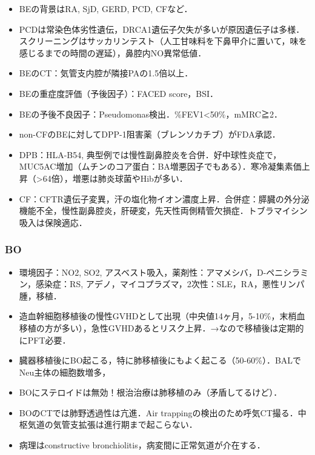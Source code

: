 \begin{itemize}
\item BEの背景はRA, SjD, GERD, PCD, CFなど．
\item PCDは常染色体劣性遺伝，DRCA1遺伝子欠失が多いが原因遺伝子は多様．スクリーニングはサッカリンテスト（人工甘味料を下鼻甲介に置いて，味を感じるまでの時間の遅延），鼻腔内NO異常低値．
\item BEのCT：気管支内腔が隣接PAの1.5倍以上．
\item BEの重症度評価（予後因子）：FACED score，BSI．
\item BEの予後不良因子：Pseudomonas検出．\%FEV1<50\%，mMRC≧2．


\item non-CFのBEに対してDPP-1阻害薬（ブレンソカチブ）がFDA承認．
\item DPB：HLA-B54, 典型例では慢性副鼻腔炎を合併．好中球性炎症で，MUC5AC増加（ムチンのコア蛋白：BA増悪因子でもある）．寒冷凝集素価上昇（>64倍），増悪は肺炎球菌やHibが多い．
\item CF：CFTR遺伝子変異，汗の塩化物イオン濃度上昇．合併症：膵臓の外分泌機能不全，慢性副鼻腔炎，肝硬変，先天性両側精管欠損症．トブラマイシン吸入は保険適応．
\end{itemize}


\subsubsection{BO}

\begin{itemize}
\item 環境因子：NO2, SO2, アスベスト吸入，薬剤性：アマメシバ，D-ペニシラミン，感染症：RS, アデノ，マイコプラズマ，2次性：SLE，RA，悪性リンパ腫，移植．
\item 造血幹細胞移植後の慢性GVHDとして出現（中央値14ヶ月，5-10\%，末梢血移植の方が多い），急性GVHDあるとリスク上昇．→なので移植後は定期的にPFT必要．
\item 臓器移植後にBO起こる，特に肺移植後にもよく起こる（50-60\%）．BALでNeu主体の細胞数増多，
\item BOにステロイドは無効！根治治療は肺移植のみ（矛盾してるけど）．
\item BOのCTでは肺野透過性は亢進．Air trappingの検出のため呼気CT撮る．中枢気道の気管支拡張は進行期まで起こらない．
\item 病理はconstructive bronchiolitis，病変間に正常気道が介在する．
\end{itemize}


